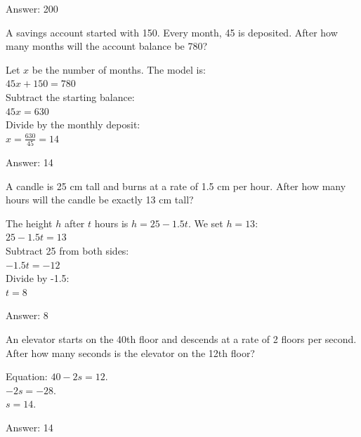\documentclass[11pt,paper=a4,answers]{exam}
\begin{document}
\begin{questions}
\begin{solution}
\vspace{20pt}
Answer: \colorbox{yellow!100}{200}
\end{solution}

\question
A savings account started with 150. Every month, 45 is deposited. After how many months will the account balance be 780?

\begin{solution}
Let $x$ be the number of months. The model is:
\\[10pt]
$45x + 150 = 780$ 
\\[10pt]
Subtract the starting balance:
\\[10pt]
$45x = 630$ 
\\[10pt]
Divide by the monthly deposit:
\\[10pt]
$x = \frac{630}{45} = 14$

\vspace{20pt}
Answer: \colorbox{yellow!100}{14}
\end{solution}

\question
A candle is 25 cm tall and burns at a rate of 1.5 cm per hour. After how many hours will the candle be exactly 13 cm tall?

\begin{solution}
The height $h$ after $t$ hours is $h = 25 - 1.5t$. We set $h = 13$:
\\[10pt]
$25 - 1.5t = 13$ 
\\[10pt]
Subtract 25 from both sides:
\\[10pt]
$-1.5t = -12$ 
\\[10pt]
Divide by -1.5:
\\[10pt]
$t = 8$

\vspace{20pt}
Answer: \colorbox{yellow!100}{8}
\end{solution}

\question
An elevator starts on the 40th floor and descends at a rate of 2 floors per second. After how many seconds is the elevator on the 12th floor?

\begin{solution}
Equation: $40 - 2s = 12$. 
\\[10pt]
$-2s = -28$. 
\\[10pt]
$s = 14$.

\vspace{20pt}
Answer: \colorbox{yellow!100}{14}
\end{solution}


\end{questions}
\end{document}
